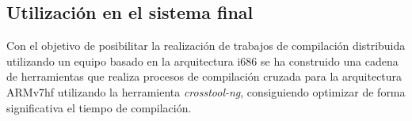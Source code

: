 \subsection{Utilización en el sistema final}
Con el objetivo de posibilitar la realización de trabajos de compilación distribuida utilizando un equipo basado en la arquitectura i686 %
se ha construido una cadena de herramientas que realiza procesos de compilación cruzada para la arquitectura ARMv7hf utilizando la herramienta \textit{crosstool-ng}\citationneeded, consiguiendo optimizar de forma significativa el tiempo de compilación.


